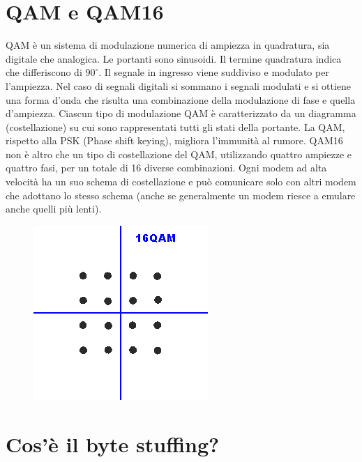 \section{QAM e QAM16}

QAM è un sistema di modulazione numerica di ampiezza in quadratura, sia digitale che analogica. 
Le portanti sono sinusoidi. Il termine quadratura indica che differiscono di $90^{\circ}$.
Il segnale in ingresso viene suddiviso e modulato per l’ampiezza. Nel caso di segnali digitali si sommano i segnali modulati e si ottiene una forma d’onda che risulta una combinazione della modulazione di fase e quella d’ampiezza.
Ciascun tipo di modulazione QAM è caratterizzato da un diagramma (costellazione) su cui sono rappresentati tutti gli stati della portante.
La QAM, rispetto alla PSK (Phase shift keying), migliora l’immunità al rumore.
QAM16 non è altro che un tipo di costellazione del QAM, utilizzando quattro ampiezze e quattro fasi, per un totale di 16 diverse combinazioni. Ogni modem ad alta velocità ha un suo schema di costellazione e può comunicare solo con altri modem che adottano lo stesso schema (anche se generalmente un modem riesce a emulare anche quelli più lenti).

\begin{figure}[H]
\centering
\includegraphics[scale=0.6]{res/img/12_QAM16.png}
\end{figure}
 
\section{Cos’è il byte stuffing?}

